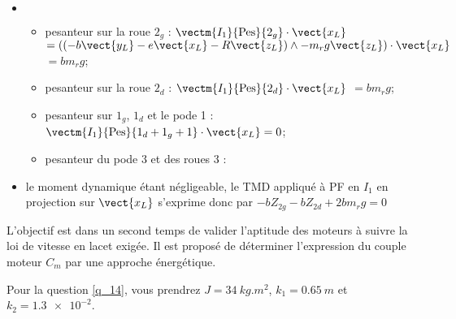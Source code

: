 \begin{corrige}
\begin{itemize}
\item $\quad$
\begin{itemize}
\item pesanteur sur la roue $2_g$ :  $\vectm{I_1}{\text{Pes}}{2_g}\cdot \vect{x_L}$
$=\left(\left(-b\vect{y_L}-e\vect{x_L}  -R \vect{z_L}   \right) \wedge - m_r g \vect{z_L}\right)\cdot \vect{x_L}$
$=b m_r g $;
\item pesanteur sur la roue $2_d$ :  $\vectm{I_1}{\text{Pes}}{2_d}\cdot \vect{x_L}$ $=b m_r g $;
\item pesanteur sur $1_g$, $1_d$ et le pode 1 :  $\vectm{I_1}{\text{Pes}}{1_d+1_g+1}\cdot \vect{x_L}=0$;
\item pesanteur du pode 3 et des roues 3 :
\end{itemize}
\item le moment dynamique étant négligeable, le TMD appliqué à PF en $I_1$ en projection sur $\vect{x_L}$ s'exprime donc par 
$  -b Z_{2g}-bZ_{2d} + 2b m_r g =0 $
\end{itemize}
\end{corrige}

\else
\fi


L’objectif est dans un second temps de valider l’aptitude des moteurs à suivre la loi de vitesse en lacet exigée. Il est
proposé de déterminer l’expression du couple moteur $C_m$ par une approche énergétique.


\ifprof
\begin{corrige}
\end{corrige}
\else
\fi


\ifprof
\begin{corrige}
\end{corrige}
\else
\fi


Pour la question \ref{q_14}, vous prendrez $J =\SI{34}{kg.m^2}$, $k_1 =\SI{0,65}{m}$ et $k_2 = \num{1,3e-2}$.

